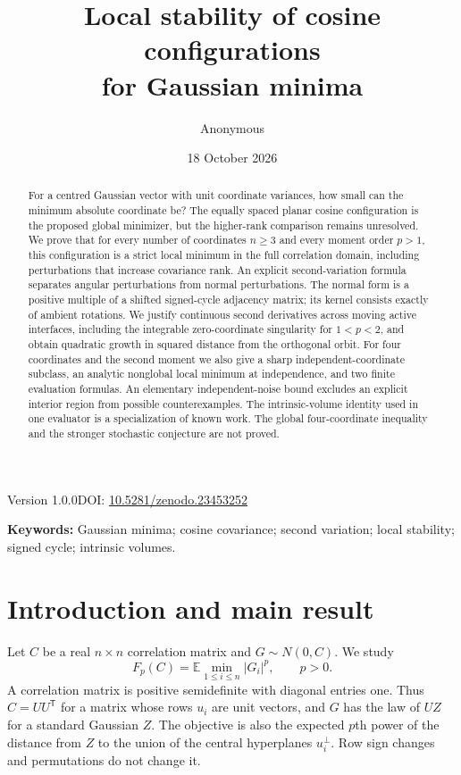 \documentclass[11pt,a4paper]{article}
\title{Local stability of cosine configurations\\for Gaussian minima}
\author{Anonymous}
\date{18 October 2026}
\theoremstyle{remark}\newtheorem{remark}[theorem]{Remark}
\newcommand{\E}{\mathbb E}
\begin{document}
\maketitle
\begin{center}\small Version 1.0.0\quad DOI: \href{https://doi.org/10.5281/zenodo.23453252}{10.5281/zenodo.23453252}\end{center}
\begin{abstract}
For a centred Gaussian vector with unit coordinate variances, how small can the minimum absolute coordinate be? The equally spaced planar cosine configuration is the proposed global minimizer, but the higher-rank comparison remains unresolved. We prove that for every number of coordinates $n\ge3$ and every moment order $p>1$, this configuration is a strict local minimum in the full correlation domain, including perturbations that increase covariance rank. An explicit second-variation formula separates angular perturbations from normal perturbations. The normal form is a positive multiple of a shifted signed-cycle adjacency matrix; its kernel consists exactly of ambient rotations. We justify continuous second derivatives across moving active interfaces, including the integrable zero-coordinate singularity for $1<p<2$, and obtain quadratic growth in squared distance from the orthogonal orbit. For four coordinates and the second moment we also give a sharp independent-coordinate subclass, an analytic nonglobal local minimum at independence, and two finite evaluation formulas. An elementary independent-noise bound excludes an explicit interior region from possible counterexamples. The intrinsic-volume identity used in one evaluator is a specialization of known work. The global four-coordinate inequality and the stronger stochastic conjecture are not proved.
\end{abstract}
\noindent\textbf{Keywords:} Gaussian minima; cosine covariance; second variation; local stability; signed cycle; intrinsic volumes.

\section{Introduction and main result}
Let $C$ be a real $n\times n$ correlation matrix and $G\sim N(0,C)$. We study
\[
 F_p(C)=\E\min_{1\le i\le n}|G_i|^p,\qquad p>0.
\]
A correlation matrix is positive semidefinite with diagonal entries one. Thus $C=UU^{\mathsf T}$ for a matrix whose rows $u_i$ are unit vectors, and $G$ has the law of $UZ$ for a standard Gaussian $Z$. The objective is also the expected $p$th power of the distance from $Z$ to the union of the central hyperplanes $u_i^\perp$. Row sign changes and permutations do not change it.
\end{document}
